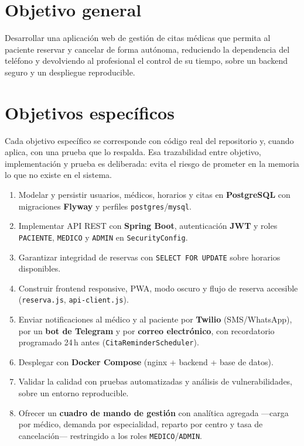 \documentclass[12pt,a4paper]{report}
\begin{document}
\section{Objetivo general}

Desarrollar una aplicación web de gestión de citas médicas que permita al paciente reservar y cancelar de forma autónoma, reduciendo la dependencia del teléfono y devolviendo al profesional el control de su tiempo, sobre un backend seguro y un despliegue reproducible.

\section{Objetivos específicos}

Cada objetivo específico se corresponde con código real del repositorio y, cuando aplica, con una prueba que lo respalda. Esa trazabilidad entre objetivo, implementación y prueba es deliberada: evita el riesgo de prometer en la memoria lo que no existe en el sistema.

\begin{enumerate}
  \item Modelar y persistir usuarios, médicos, horarios y citas en \textbf{PostgreSQL} con migraciones \textbf{Flyway} y perfiles \texttt{postgres}/\texttt{mysql}.
  \item Implementar API REST con \textbf{Spring Boot}, autenticación \textbf{JWT} y roles \texttt{PACIENTE}, \texttt{MEDICO} y \texttt{ADMIN} en \texttt{SecurityConfig}.
  \item Garantizar integridad de reservas con \texttt{SELECT FOR UPDATE} sobre horarios disponibles.
  \item Construir frontend responsive, PWA, modo oscuro y flujo de reserva accesible (\texttt{reserva.js}, \texttt{api-client.js}).
  \item Enviar notificaciones al médico y al paciente por \textbf{Twilio} (SMS/WhatsApp), por un \textbf{bot de Telegram} y por \textbf{correo electrónico}, con recordatorio programado 24\,h antes (\texttt{CitaReminderScheduler}).
  \item Desplegar con \textbf{Docker Compose} (nginx + backend + base de datos).
  \item Validar la calidad con pruebas automatizadas y análisis de vulnerabilidades, sobre un entorno reproducible.
  \item Ofrecer un \textbf{cuadro de mando de gestión} con analítica agregada —carga por médico, demanda por especialidad, reparto por centro y tasa de cancelación— restringido a los roles \texttt{MEDICO}/\texttt{ADMIN}.
\end{enumerate}
\end{document}
